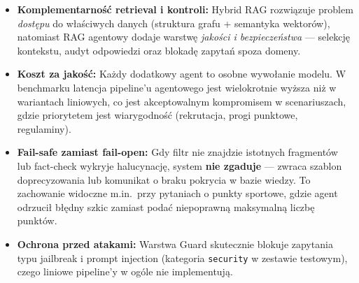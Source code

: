 \begin{tcolorbox}[colback=green!5!white,colframe=green!50!black,title=Wnioski projektowe]
    \begin{itemize}[leftmargin=*]
        \item \textbf{Komplementarność retrieval i kontroli:} Hybrid RAG rozwiązuje problem \textit{dostępu} do właściwych danych
              (struktura grafu + semantyka wektorów), natomiast RAG agentowy dodaje warstwę \textit{jakości i bezpieczeństwa} ---
              selekcję kontekstu, audyt odpowiedzi oraz blokadę zapytań spoza domeny.
        \item \textbf{Koszt za jakość:} Każdy dodatkowy agent to osobne wywołanie modelu. W benchmarku latencja pipeline'u agentowego
              jest wielokrotnie wyższa niż w wariantach liniowych, co jest akceptowalnym kompromisem w scenariuszach,
              gdzie priorytetem jest wiarygodność (rekrutacja, progi punktowe, regulaminy).
        \item \textbf{Fail-safe zamiast fail-open:} Gdy filtr nie znajdzie istotnych fragmentów lub fact-check wykryje halucynację,
              system \textbf{nie zgaduje} --- zwraca szablon doprecyzowania lub komunikat o braku pokrycia w bazie wiedzy.
              To zachowanie widoczne m.in.\ przy pytaniach o punkty sportowe, gdzie agent odrzucił błędny szkic zamiast
              podać niepoprawną maksymalną liczbę punktów.
        \item \textbf{Ochrona przed atakami:} Warstwa Guard skutecznie blokuje zapytania typu jailbreak i prompt injection
              (kategoria \texttt{security} w zestawie testowym), czego liniowe pipeline'y w ogóle nie implementują.
    \end{itemize}
\end{tcolorbox}

\vspace{1em}

\newpage
